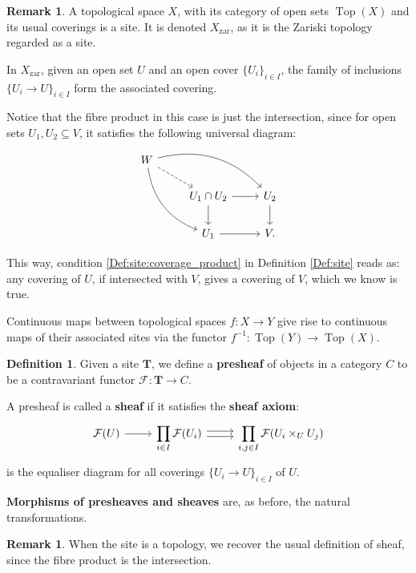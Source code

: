 \documentclass{report}
\DeclareMathOperator{\Top}{Top}
\theoremstyle{definition}
\newtheorem{definition}[theorem]{Definition}
\newtheorem{remark}[theorem]{Remark}
\begin{document}
\begin{remark}
A topological space $X$, with its category of open sets $\Top(X)$ and its usual coverings is a site. It is denoted $X_{\text{zar}}$, as it is the Zariski topology regarded as a site.

In $X_{\text{zar}}$, given an open set $U$ and an open cover $\{U_i\}_{i\in I}$, the family of inclusions $\{U_i\rightarrow U\}_{i\in I}$ form the associated covering.

Notice that the fibre product in this case is just the intersection, since for open sets $U_1,U_2\subseteq V$, it satisfies the following universal diagram:
\[
\begin{tikzcd}
W\arrow[rrd,bend left]\arrow[rdd,bend right]\arrow[rd,dashed]\\
&U_1\cap U_2\arrow[r]\arrow[d]&U_2\arrow[d]\\
&U_1\arrow[r]&V.
\end{tikzcd}
\]

This way, condition \ref{Def:site:coverage_product} in Definition \ref{Def:site} reads as: any covering of $U$, if intersected with $V$, gives a covering of $V$, which we know is true.
\vspace{2mm}

Continuous maps between topological spaces $f:X\rightarrow Y$ give rise to continuous maps of their associated sites via the functor $f^{-1}:\Top(Y)\rightarrow\Top(X)$.
\end{remark}

\begin{definition}
Given a site $\boldsymbol{T}$, we define a \textbf{presheaf} of objects in a category $C$ to be a contravariant functor $\mathcal{F}:\boldsymbol{T}\rightarrow C$.

A presheaf is called a \textbf{sheaf} if it satisfies the \textbf{sheaf axiom}:
\[
\begin{tikzcd}
\mathcal{F}(U)\arrow[r]&\displaystyle{\prod_{i\in I}\mathcal{F}(U_i)}\arrow[r,shift left]\arrow[r,shift right]&\displaystyle{\prod_{i,j\in I}\mathcal{F}(U_i\times_UU_j)}
\end{tikzcd}
\]
is the equaliser diagram for all coverings $\{U_i\rightarrow U\}_{i\in I}$ of $U$.

\textbf{Morphisms of presheaves and sheaves} are, as before, the natural transformations.
\end{definition}

\begin{remark}
When the site is a topology, we recover the usual definition of sheaf, since the fibre product is the intersection.
\end{remark}
\end{document}
